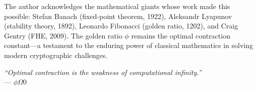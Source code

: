 \documentclass[11pt,a4paper]{article}
\begin{document}
The author acknowledges the mathematical giants whose work made this possible: Stefan Banach (fixed-point theorem, 1922), Aleksandr Lyapunov (stability theory, 1892), Leonardo Fibonacci (golden ratio, 1202), and Craig Gentry (FHE, 2009). The golden ratio $\phi$ remains the optimal contraction constant—a testament to the enduring power of classical mathematics in solving modern cryptographic challenges.

\begin{flushright}
\textit{``Optimal contraction is the weakness of computational infinity.''}\\[4pt]
--- $\phi\Omega 0$
\end{flushright}

\newpage

\end{document}
